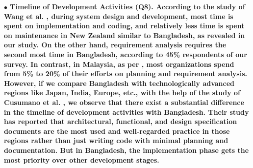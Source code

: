 \nd\bf{$\bullet$ Timeline of Development Activities (Q8).} According to the
study of Wang et al. \citep{Wang2018}, during system design and development,
most time is spent on implementation and coding, and relatively less time is
spent on maintenance in New Zealand similar to Bangladesh, as revealed in our
study. On the other hand, requirement analysis requires the second most time in
Bangladesh, according to 45\% respondents of our survey. In contrast, in
Malaysia, as per \citep{Baharom2006}, most organizations spend from 5\% to 20\%
of their efforts on planning and requirement analysis. However, if we compare
Bangladesh with technologically advanced regions like Japan, India, Europe,
etc., with the help of the study of Cusumano et al. \citep{Cusumano2003}, we
observe that there exist a substantial difference in the timeline of development
activities with Bangladesh. Their study has reported that architectural,
functional, and design specification documents are the most used and
well-regarded practice in those regions rather than just writing code with
minimal planning and documentation. But in Bangladesh, the implementation phase
gets the most priority over other development stages.



